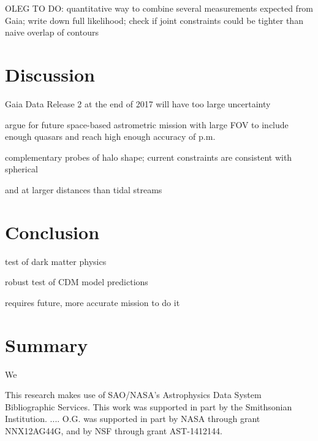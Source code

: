 \documentclass[iop]{emulateapj}
\begin{document}
OLEG TO DO: quantitative way to combine several measurements expected from Gaia; write down full likelihood; check if joint constraints could be tighter than naive overlap of contours


\section{Discussion}

Gaia Data Release 2 at the end of 2017 will have too large uncertainty

argue for future space-based astrometric mission with large FOV to include enough quasars and reach high enough accuracy of p.m.

complementary probes of halo shape; current constraints are consistent with spherical

and at larger distances than tidal streams


\section{Conclusion}\label{sec:pm}

test of dark matter physics

robust test of CDM model predictions

requires future, more accurate mission to do it


\section{Summary}\label{sec:sum}

We 


\bigskip
\acknowledgements

This research makes use of SAO/NASA's Astrophysics Data System Bibliographic Services.  This work was supported in part by the Smithsonian Institution. ....
O.G. was supported in part by NASA through grant NNX12AG44G, and by NSF through grant AST-1412144.

\makeatletter\@chicagotrue\makeatother


%
\end{document}
